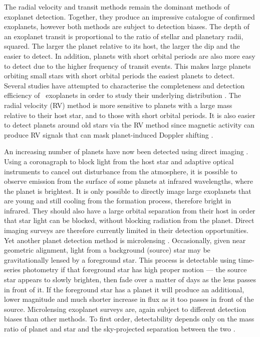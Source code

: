 The radial velocity and transit methods remain the dominant methods of
exoplanet detection.
Together, they produce an impressive catalogue of confirmed exoplanets,
however both methods are subject to detection biases.
The depth of an exoplanet transit is proportional to the ratio of stellar and
planetary radii, squared.
The larger the planet relative to its host, the larger the dip and the easier
to detect.
In addition, planets with short orbital periods are also more easy to detect
due to the higher frequency of transit events.
This makes large planets orbiting small stars with short orbital periods the
easiest planets to detect.
Several studies have attempted to characterise the completeness and detection
efficiency of \kepler\ exoplanets in order to study their underlying
distribution \citep[\eg][]{Petigura2013, Foreman-Mackey2014,
Burke2015, Dressing2015}.
The radial velocity (RV) method is more sensitive to planets with a large mass
relative to their host star, and to those with short orbital periods.
It is also easier to detect planets around old stars via the RV method since
magnetic activity can produce RV signals that can mask planet-induced Doppler
shifting \citep[\eg][]{Aigrain_2012, Rajpaul2015, Rajpaul2016}.

An increasing number of planets have now been detected using direct imaging
\citep[\eg][]{Kalas2008, Nielsen2013}.
Using a coronagraph to block light from the host star and adaptive optical
instruments to cancel out disturbance from the atmosphere, it is possible to
observe emission from the surface of some planets at infrared wavelengths,
where the planet is brightest.
It is only possible to directly image large exoplanets that are young and
still cooling from the formation process, therefore bright in infrared.
They should also have a large orbital separation from their host in order that
star light can be blocked, without blocking radiation from the planet.
Direct imaging surveys are therefore currently limited in their detection
opportunities.
Yet another planet detection method is microlensing \citep[\eg][]{Abe2004,
Gould2010, Cassan2012, Goudi2012}.
Occasionally, given near geometric alignment, light from a background (source)
star may be gravitationally lensed by a foreground star.
This process is detectable using time-series photometry if that foreground
star has high proper motion --- the source star appears to slowly brighten,
then fade over a matter of days as the lens passes in front of it.
If the foreground star has a planet it will produce an additional, lower
magnitude and much shorter increase in flux as it too passes in front of the
source.
Microlensing exoplanet surveys are, again subject to different detection
biases than other methods.
To first order, detectability depends only on the mass ratio of planet and
star and the sky-projected separation between the two \citep{Clanton2016}.

